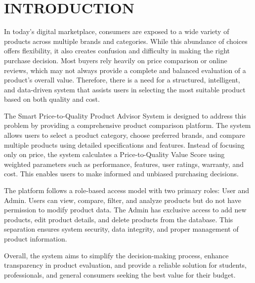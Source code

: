 \chapter{INTRODUCTION}

In today’s digital marketplace, consumers are exposed to a wide variety of products across multiple brands and categories. While this abundance of choices offers flexibility, it also creates confusion and difficulty in making the right purchase decision. Most buyers rely heavily on price comparison or online reviews, which may not always provide a complete and balanced evaluation of a product’s overall value. Therefore, there is a need for a structured, intelligent, and data-driven system that assists users in selecting the most suitable product based on both quality and cost.

The Smart Price-to-Quality Product Advisor System is designed to address this problem by providing a comprehensive product comparison platform. The system allows users to select a product category, choose preferred brands, and compare multiple products using detailed specifications and features. Instead of focusing only on price, the system calculates a Price-to-Quality Value Score using weighted parameters such as performance, features, user ratings, warranty, and cost. This enables users to make informed and unbiased purchasing decisions.

The platform follows a role-based access model with two primary roles: User and Admin. Users can view, compare, filter, and analyze products but do not have permission to modify product data. The Admin has exclusive access to add new products, edit product details, and delete products from the database. This separation ensures system security, data integrity, and proper management of product information.

Overall, the system aims to simplify the decision-making process, enhance transparency in product evaluation, and provide a reliable solution for students, professionals, and general consumers seeking the best value for their budget.


